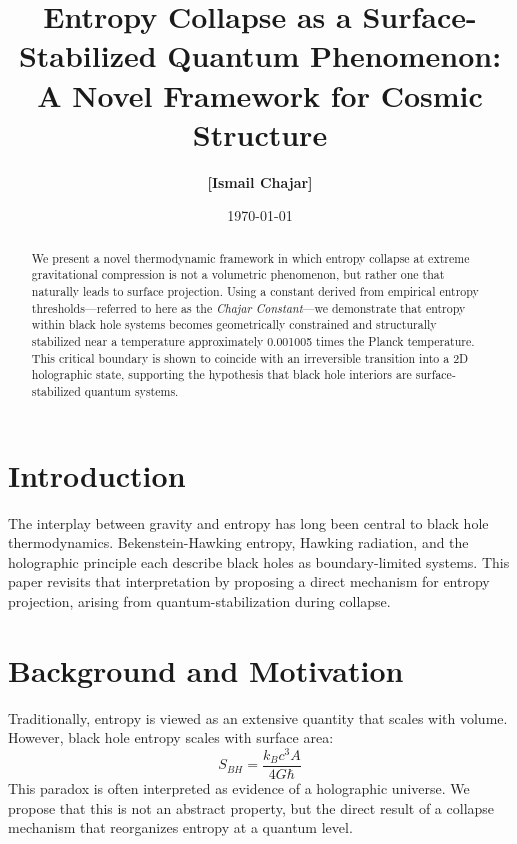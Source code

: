 \documentclass[12pt]{article}
\title{Entropy Collapse as a Surface-Stabilized Quantum Phenomenon: \\ A Novel Framework for Cosmic Structure}
\author{\textbf{[Ismail Chajar]}}
\date{\today}
\begin{document}
\maketitle

\begin{abstract}
We present a novel thermodynamic framework in which entropy collapse at extreme gravitational compression is not a volumetric phenomenon, but rather one that naturally leads to surface projection. Using a constant derived from empirical entropy thresholds---referred to here as the \textit{Chajar Constant}---we demonstrate that entropy within black hole systems becomes geometrically constrained and structurally stabilized near a temperature approximately 0.001005 times the Planck temperature. This critical boundary is shown to coincide with an irreversible transition into a 2D holographic state, supporting the hypothesis that black hole interiors are surface-stabilized quantum systems.
\end{abstract}

\section{Introduction}
The interplay between gravity and entropy has long been central to black hole thermodynamics. Bekenstein-Hawking entropy, Hawking radiation, and the holographic principle each describe black holes as boundary-limited systems. This paper revisits that interpretation by proposing a direct mechanism for entropy projection, arising from quantum-stabilization during collapse.

\section{Background and Motivation}
Traditionally, entropy is viewed as an extensive quantity that scales with volume. However, black hole entropy scales with surface area:
\begin{equation}
S_{BH} = \frac{k_B c^3 A}{4 G \hbar}
\end{equation}
This paradox is often interpreted as evidence of a holographic universe. We propose that this is not an abstract property, but the direct result of a collapse mechanism that reorganizes entropy at a quantum level.
\end{document}
